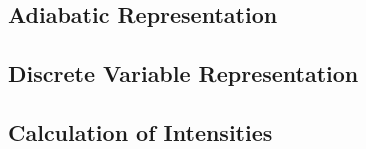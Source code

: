 %
%



\subsection{Adiabatic Representation}


\subsection{Discrete Variable Representation}


\subsection{Calculation of Intensities}


%
